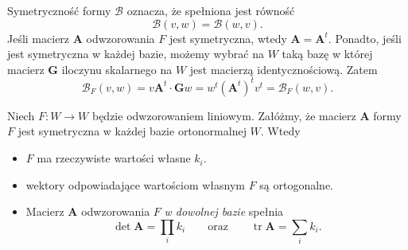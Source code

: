 \begin{uwaga}

Symetryczność formy $\mathcal{B}$ oznacza, że spełniona jest r\'owność
\[\mathcal{B}(v,w)=\mathcal{B}(w,v).\]
Jeśli macierz $\mathbf{A}$ odwzorowania $F$ jest symetryczna, wtedy $\mathbf{A}=\mathbf{A}^t$. Ponadto, jeśli jest symetryczna w każdej bazie, możemy wybrać na $W$ taką bazę w kt\'orej macierz $\mathbf{G}$ iloczynu skalarnego na $W$ jest macierzą identycznościową. Zatem
\[\mathcal B_{F}(v,w)= v \mathbf{A}^t \cdot \mathbf{G} w= w^t \left(\mathbf{A}^t\right)^t v^t=\mathcal{B}_{F}(w,v).\]

\end{uwaga}


\begin{frame}[<+->]

\end{frame}


\begin{frame}[<+->]

\begin{lemat}\label{lem:alg-lin-2-eigen}
Niech $F\colon W\to W$ będzie odwzorowaniem liniowym. Załóżmy, że macierz $\mathbf{A}$ formy $F$ jest symetryczna w każdej bazie ortonormalnej $W$.
Wtedy

\begin{itemize}
\item $F$ ma rzeczywiste wartości własne $k_i$.
\item wektory odpowiadające wartościom własnym $F$ są ortogonalne.
\item Macierz $\mathbf{A}$ odwzorowania $F$ \textit{w dowolnej bazie} spełnia
\[\det \mathbf{A}=\prod_i k_i\qquad \text{oraz}\qquad \operatorname{tr} \mathbf{A}=\sum_i k_i.\]

\end{itemize}
\end{lemat}

\end{frame}

